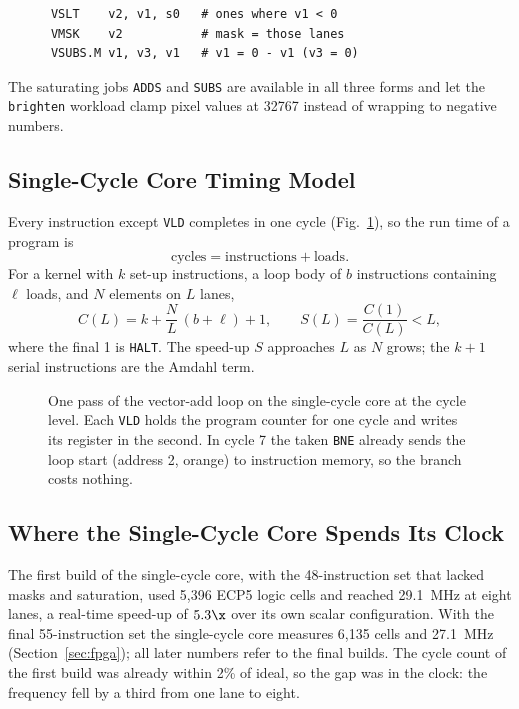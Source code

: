 \noindent\begin{minipage}{\columnwidth}
\begin{lstlisting}
      VSLT    v2, v1, s0   # ones where v1 < 0
      VMSK    v2           # mask = those lanes
      VSUBS.M v1, v3, v1   # v1 = 0 - v1 (v3 = 0)
\end{lstlisting}
\end{minipage}

The saturating jobs \texttt{ADDS} and \texttt{SUBS} are available in all three forms and
let the \texttt{brighten} workload clamp pixel values at 32767 instead of wrapping to
negative numbers.

\subsection{Single-Cycle Core Timing Model}\label{sec:timing}
Every instruction except \texttt{VLD} completes in one cycle (Fig.~\ref{fig:timing}),
so the run time of a program is
\begin{equation}
  \text{cycles} = \text{instructions} + \text{loads}.
  \label{eq:cycles}
\end{equation}
For a kernel with $k$ set-up instructions, a loop body of $b$ instructions containing
$\ell$ loads, and $N$ elements on $L$ lanes,
\begin{equation}
  C(L) = k + \frac{N}{L}\,(b + \ell) + 1, \qquad
  S(L) = \frac{C(1)}{C(L)} < L,
  \label{eq:model}
\end{equation}
where the final 1 is \texttt{HALT}. The speed-up $S$ approaches $L$ as $N$ grows; the
$k + 1$ serial instructions are the Amdahl term.

\begin{figure}[t]
\centering

\caption{One pass of the vector-add loop on the single-cycle core at the cycle level.
Each \texttt{VLD} holds the program counter for one cycle and writes its register in the
second. In cycle 7 the taken \texttt{BNE} already sends the loop start (address 2,
orange) to instruction memory, so the branch costs nothing.}
\label{fig:timing}
\end{figure}

\subsection{Where the Single-Cycle Core Spends Its Clock}\label{sec:why}
The first build of the single-cycle core, with the 48-instruction set that lacked masks
and saturation, used 5,396 ECP5 logic cells and reached 29.1~MHz at eight lanes, a
real-time speed-up of $5.3\x$ over its own scalar configuration. With the final
55-instruction set the single-cycle core measures 6,135 cells and 27.1~MHz
(Section~\ref{sec:fpga}); all later numbers refer to the final builds. The cycle count of
the first build was already within 2\% of ideal, so the gap was in the clock: the
frequency fell by a third from one lane to eight.

